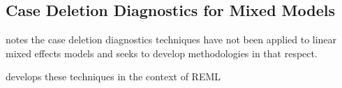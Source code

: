 


\subsection{Case Deletion Diagnostics for Mixed Models}


\citet{Christiansen} notes the case deletion diagnostics techniques have not been applied to linear mixed effects 
models and seeks to develop methodologies in that respect.


\citet{Christiansen} develops these techniques in the context of REML
